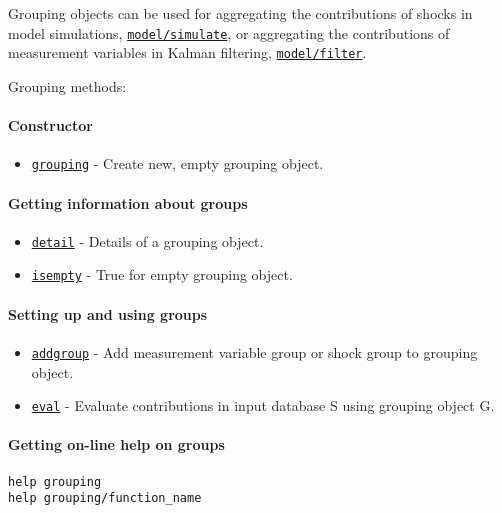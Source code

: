 

	Grouping objects can be used for aggregating the contributions of shocks
in model simulations, \href{model/simulate}{\texttt{model/simulate}}, or
aggregating the contributions of measurement variables in Kalman
filtering, \href{model/filter}{\texttt{model/filter}}.

Grouping methods:

\paragraph{Constructor}\label{constructor}

\begin{itemize}
\itemsep1pt\parskip0pt
\item
  \href{grouping/grouping}{\texttt{grouping}} - Create new, empty
  grouping object.
\end{itemize}

\paragraph{Getting information about
groups}\label{getting-information-about-groups}

\begin{itemize}
\itemsep1pt\parskip0pt
\item
  \href{grouping/detail}{\texttt{detail}} - Details of a grouping
  object.
\item
  \href{grouping/isempty}{\texttt{isempty}} - True for empty grouping
  object.
\end{itemize}

\paragraph{Setting up and using
groups}\label{setting-up-and-using-groups}

\begin{itemize}
\itemsep1pt\parskip0pt
\item
  \href{grouping/addgroup}{\texttt{addgroup}} - Add measurement variable
  group or shock group to grouping object.
\item
  \href{grouping/eval}{\texttt{eval}} - Evaluate contributions in input
  database S using grouping object G.
\end{itemize}

\paragraph{Getting on-line help on
groups}\label{getting-on-line-help-on-groups}

\begin{verbatim}
help grouping
help grouping/function_name
\end{verbatim}



